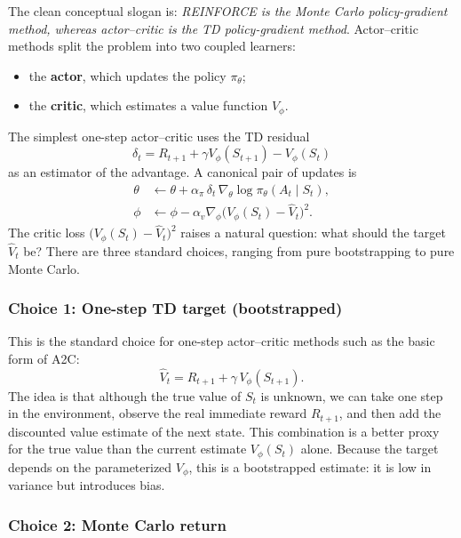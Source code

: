 \documentclass[11pt]{article}
\newcommand{\1}{\mathbf{1}}
\begin{document}
The clean conceptual slogan is: \emph{REINFORCE is the Monte Carlo policy-gradient method, whereas actor--critic is the TD policy-gradient method}. Actor--critic methods split the problem into two coupled learners:
\begin{itemize}
    \item the \textbf{actor}, which updates the policy $\pi_\theta$;
    \item the \textbf{critic}, which estimates a value function $V_\phi$.
\end{itemize}
The simplest one-step actor--critic uses the TD residual
\begin{equation}
\delta_t=R_{t+1}+\gamma V_\phi(S_{t+1})-V_\phi(S_t)
\end{equation}
as an estimator of the advantage. A canonical pair of updates is
\begin{align}
\theta &\leftarrow \theta + \alpha_\pi\,\delta_t\,\nabla_\theta\log\pi_\theta(A_t\mid S_t), \\
\phi &\leftarrow \phi - \alpha_v\nabla_\phi\bigl(V_\phi(S_t)-\hat V_t\bigr)^2.
\end{align}
The critic loss $\bigl(V_\phi(S_t)-\hat V_t\bigr)^2$ raises a natural question: what should the target $\hat V_t$ be? There are three standard choices, ranging from pure bootstrapping to pure Monte Carlo.

\subsubsection*{Choice 1: One-step TD target (bootstrapped)}

This is the standard choice for one-step actor--critic methods such as the basic form of A2C:
\begin{equation}
\hat V_t = R_{t+1} + \gamma\, V_\phi(S_{t+1}).
\end{equation}
The idea is that although the true value of $S_t$ is unknown, we can take one step in the environment, observe the real immediate reward $R_{t+1}$, and then add the discounted value estimate of the next state. This combination is a better proxy for the true value than the current estimate $V_\phi(S_t)$ alone. Because the target depends on the parameterized $V_\phi$, this is a bootstrapped estimate: it is low in variance but introduces bias.

\subsubsection*{Choice 2: Monte Carlo return}
\end{document}
